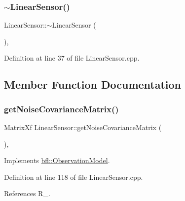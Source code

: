\subsubsection{\texorpdfstring{$\sim$\+Linear\+Sensor()}{~LinearSensor()}}
{\footnotesize\ttfamily Linear\+Sensor\+::$\sim$\+Linear\+Sensor (\begin{DoxyParamCaption}{ }\end{DoxyParamCaption})\hspace{0.3cm}{\ttfamily [virtual]}, {\ttfamily [noexcept]}}



Definition at line 37 of file Linear\+Sensor.\+cpp.



\subsection{Member Function Documentation}
\mbox{\label{classbfl_1_1LinearSensor_a7773e8de7eb58b07b1ca781b20d8537e}} 
\subsubsection{\texorpdfstring{get\+Noise\+Covariance\+Matrix()}{getNoiseCovarianceMatrix()}}
{\footnotesize\ttfamily Matrix\+Xf Linear\+Sensor\+::get\+Noise\+Covariance\+Matrix (\begin{DoxyParamCaption}{ }\end{DoxyParamCaption})\hspace{0.3cm}{\ttfamily [override]}, {\ttfamily [virtual]}}



Implements \mbox{\hyperlink{classbfl_1_1ObservationModel_a63357b1456a4a5387e55d31ddb0b9b50}{bfl\+::\+Observation\+Model}}.



Definition at line 118 of file Linear\+Sensor.\+cpp.



References R\+\_\+.

\mbox{\label{classbfl_1_1LinearSensor_a5079f70d2a2995cff4ad3210dd1795f7}} 
